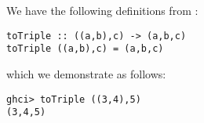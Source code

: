 
We have the following definitions from :
\scriptsize\begin{verbatim}
toTriple :: ((a,b),c) -> (a,b,c)
toTriple ((a,b),c) = (a,b,c)
\end{verbatim}\normalsize
which we demonstrate as follows:
\scriptsize\begin{verbatim}
ghci> toTriple ((3,4),5)
(3,4,5)
\end{verbatim}\normalsize

